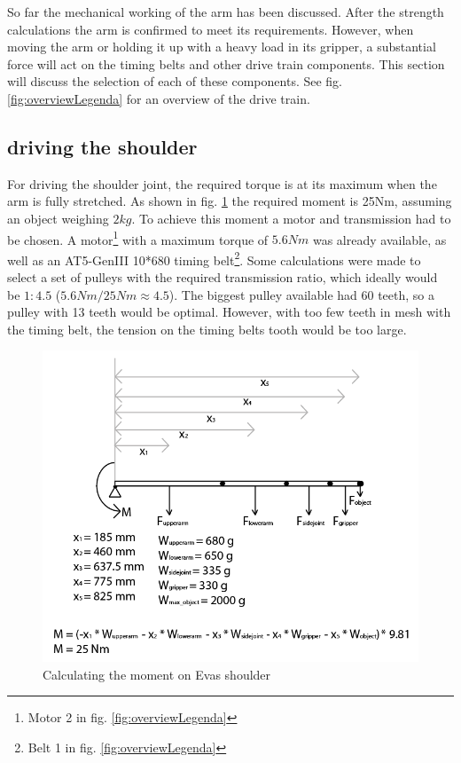 \documentclass[technical_document.tex]{subfiles}
\begin{document}
So far the mechanical working of the arm has been discussed. After the strength calculations the arm is confirmed to meet its requirements. However, when moving the arm or holding it up with a heavy load in its gripper, a substantial force will act on the timing belts and other drive train components. This section will discuss the selection of each of these components. See fig. \ref{fig:overviewLegenda} for an overview of the drive train.



\subsection{driving the shoulder}

For driving the shoulder joint, the required torque is at its maximum when the arm is fully stretched. As shown in fig. \ref{fig:driveTrain_shoulder} the required moment is 25Nm, assuming an object weighing $2kg$. To achieve this moment a motor and transmission had to be chosen. A motor\footnote{Motor 2 in fig. \ref{fig:overviewLegenda}} with a maximum torque of $5.6Nm$ was already available, as well as an AT5-GenIII 10*680 timing belt\footnote{Belt 1 in fig. \ref{fig:overviewLegenda}}. Some calculations were made to select a set of pulleys with the required transmission ratio, which ideally would be $1:4.5$ ($5.6Nm / 25Nm \approx 4.5$). The biggest pulley available had 60 teeth, so a pulley with 13 teeth would be optimal. However, with too few teeth in mesh with the timing belt, the tension on the timing belt\textquotesingle{}s tooth would be too large.

\begin{figure}[ht!]
	\centering
	\mbox{\includegraphics[scale=0.5]{Images/driveTrain_shoulder.png}}
	\caption{Calculating the moment on Eva\textquotesingle{}s shoulder}
	\label{fig:driveTrain_shoulder}
\end{figure}
 
\end{document}
